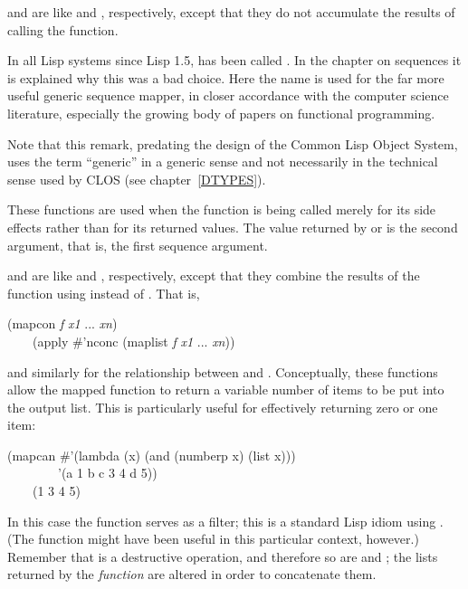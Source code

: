 \begin{defun}[Function]
 and  are like  and ,
respectively, except that they do not accumulate the results
of calling the function.

\beforenoterule
\begin{incompatibility}
In all Lisp systems since Lisp 1.5,
 has been called .  In the chapter on sequences
it is explained why this was a bad choice.  Here the name 
is used for the far more useful generic sequence mapper,
in closer accordance with the computer science literature,
especially the growing body of papers on functional programming.
\begin{new}
Note that this remark, predating the design of the Common Lisp Object System,
uses the term ``generic'' in a generic sense and not necessarily
in the technical sense used by CLOS
(see chapter~\ref{DTYPES}).
\end{new}
\end{incompatibility}
\afternoterule

These functions are used when the function is being called merely for its
side effects rather than for its returned values.
The value returned by  or  is the second argument,
that is, the first sequence argument.

 and  are like  and , respectively,
except that they combine the results of
the function using  instead of .  That is,
\begin{lisp}
(mapcon \textit{f} \textit{x1} ... \textit{xn}) \\
~~~\EQ\ (apply \#'nconc (maplist \textit{f} \textit{x1} ... \textit{xn}))
\end{lisp}
and similarly for the relationship between  and .
Conceptually, these functions allow the mapped function to return
a variable number of items to be put into the output list.
This is particularly useful for effectively returning zero or one item:
\begin{lisp}
(mapcan \#'(lambda (x) (and (numberp x) (list x))) \\
~~~~~~~~'(a 1 b c 3 4 d 5)) \\
~~~\EV\ (1 3 4 5)
\end{lisp}
In this case the function serves as a filter; this is a standard Lisp
idiom using .
(The function  might have been useful in this
particular context, however.)
Remember that  is a destructive operation, and therefore
so are  and ; the lists returned by the \textit{function}
are altered in order to concatenate them.


\end{defun}
